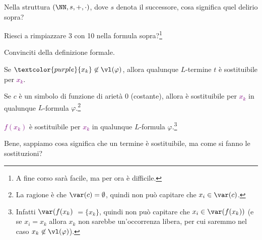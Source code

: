 \begin{exercise}
    Nella struttura $(\NN, s,+,\cdot)$, dove $s$ denota il successore, cosa significa quel delirio sopra?
\end{exercise}

\begin{exercise}
    [Difficile]
    Riesci a rimpiazzare 3 con 10 nella formula sopra?\footnote{A fine corso sarà facile, ma per ora è difficile.}
\end{exercise}

\begin{exercise}
    Convinciti della definizione formale.
\end{exercise}

\begin{remark}
    Se $\textcolor{purple}{x_k} \not \in \vl(\varphi)$, allora qualunque $L$-termine $t$ è sostituibile per \textcolor{purple}{$x_k$}.
\end{remark}

\begin{remark}
    Se $c$ è un simbolo di funzione di arietà 0 (costante), allora è sostituibile per \textcolor{purple}{$x_k$} in qualunque $L$-formula $\varphi$.\footnote{La ragione è che $\var(c) = \emptyset$, quindi non può capitare che $x_i \in \var(c)$.}
\end{remark}

\begin{remark}
    \textcolor{purple}{$f(x_k)$} è sostituibile per \textcolor{purple}{$x_k$} in qualunque $L$-formula $\varphi$.\footnote{Infatti $\var(f(x_k)$ $= \{x_k\}$, quindi non può capitare che $x_i \in \var(f(x_k))$ (e se $x_i = x_k$ allora $x_k$ non sarebbe un'occorrenza libera, per cui saremmo nel caso $x_k \not \in \vl(\varphi)$).}
\end{remark}

Bene, sappiamo cosa significa che un termine è sostituibile, ma come si fanno le sostituzioni?

